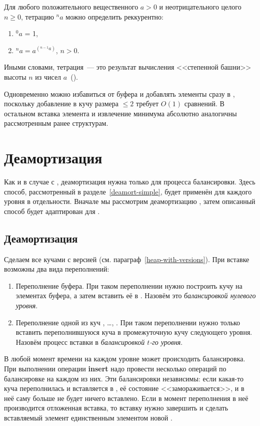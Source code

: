 \begin{definition}
Для любого положительного вещественного $a > 0$ и неотрицательного целого $n \geq 0$,
тетрацию ${}^na$ можно определить реккурентно:
\begin{enumerate}
\item ${}^0a$ = 1,
\item ${}^na = a^{({}^{n-1}a)}$, $n > 0$.
\end{enumerate}
Иными словами, тетрация~--- это результат вычисления <<степенной башни>> высоты $n$
из чисел $a$~(\cite{tetration}).
\end{definition}

Одновременно можно избавиться от буфера и добавлять элементы сразу в \MH[1], поскольку
добавление в кучу размера $\leq 2$ требует $O(1)$ сравнений. В остальном
вставка элемента и извлечение минимума абсолютно аналогичны рассмотренным ранее структурам.

\section{Деамортизация}
Как и в случае с \SCH, деамортизация нужна только для процесса балансировки.
Здесь способ, рассмотренный в разделе~\ref{deamort-simple}, будет применён для
каждого уровня в отдельности. Вначале мы рассмотрим деамортизацию \CH[r],
затем описанный способ будет адаптирован для \CH[*].

\subsection{Деамортизация \CH[r]}
Сделаем все \MH[t] кучами с версией (см. параграф~\ref{heap-with-versions}).
При вставке возможны два вида переполнений:
\begin{enumerate}
\item Переполнение буфера. При таком переполнении нужно построить кучу на элементах
    буфера, а затем вставить её в \MH[1]. Назовём это \emph{балансировкой нулевого уровня}.
\item Переполнение одной из куч \MH[1], \dots, \MH[r-1]. При таком переполнении
    нужно только вставить переполнившуюся куча в промежуточную кучу следующего
    уровня. Назовём процесс вставки \MH[t] в \MH[t+1] \emph{балансировкой $t$-го уровня}.
\end{enumerate}

В любой момент времени на каждом уровне может происходить балансировка. При выполнении
операции \textbf{insert} надо провести несколько операций по балансировке на каждом из них.
Эти балансировки независимы: если какая-то куча \MH[t] переполнилась и вставляется
в \MH[t+1], её состояние <<замораживается>>, и в неё саму больше не будет ничего вставлено.
Если в момент переполнения \MH[t] в неё производится отложенная вставка,
то вставку нужно завершить и сделать вставляемый элемент единственным
элементом новой \MH[t].

